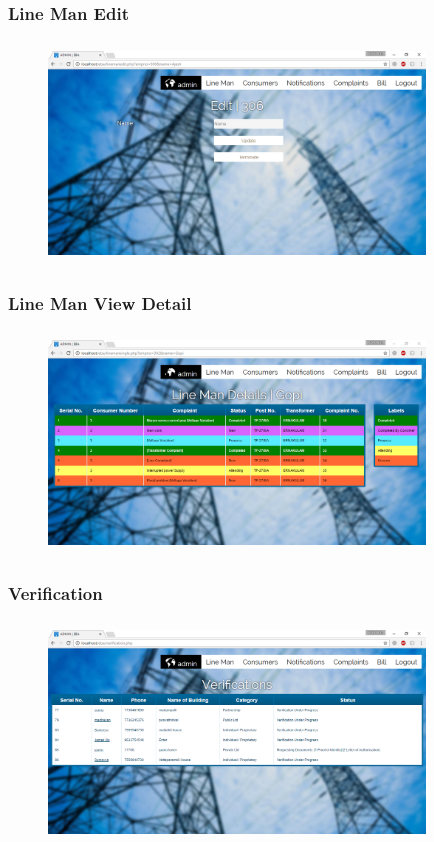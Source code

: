 \documentclass{beamer} %
\theoremstyle{definition} %
\begin{document}
\begin{frame}
\frametitle{Line Man Edit }
\begin{figure}[center]
\includegraphics[width=10cm ,height=5.9cm]{linemanedit.png} 
\end{figure}
\end{frame}

\begin{frame}
\frametitle{Line Man View Detail}
\begin{figure}[center]
\includegraphics[width=10cm ,height=5.9cm]{linemanviewdetail.png} 
\end{figure}
\end{frame}

\begin{frame}
\frametitle{Verification }
\begin{figure}[center]
\includegraphics[width=10cm ,height=5.9cm]{verification.png} 
\end{figure}
\end{frame}
\end{document}
